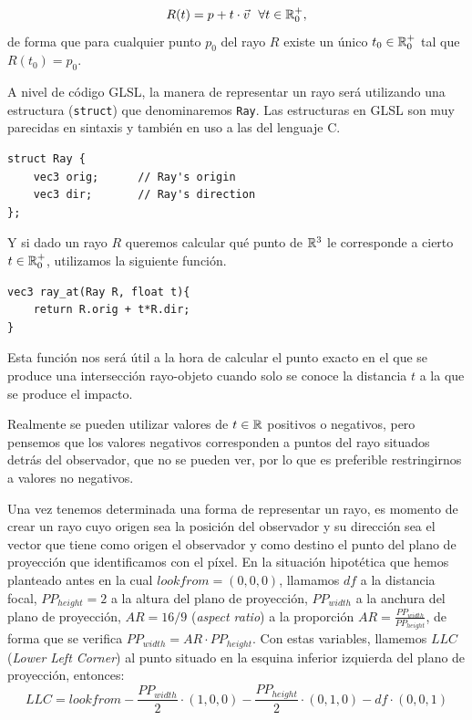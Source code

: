 $$
R(t) = p + t\cdot \vec v \ \ \forall t\in\mathbb{R}_0^+,
$$
de forma que para cualquier punto $p_0$ del rayo $R$ existe un único $t_0\in\mathbb{R}_0^+$ tal que $R(t_0) = p_0$.

A nivel de código GLSL, la manera de representar un rayo será utilizando una estructura (\verb|struct|) que denominaremos \verb|Ray|. Las estructuras en GLSL son muy parecidas en sintaxis y también en uso a las del lenguaje C. 

\begin{lstlisting}
struct Ray {
    vec3 orig;      // Ray's origin
    vec3 dir;       // Ray's direction
};
\end{lstlisting}

Y si dado un rayo $R$ queremos calcular qué punto de $\mathbb{R}^3$ le corresponde a cierto $t\in\mathbb{R}_0^+$, utilizamos la siguiente función.

\begin{lstlisting}
vec3 ray_at(Ray R, float t){
    return R.orig + t*R.dir;
}
\end{lstlisting}

Esta función nos será útil a la hora de calcular el punto exacto en el que se produce una intersección rayo-objeto cuando solo se conoce la distancia $t$ a la que se produce el impacto.

\begin{observacion}
    Realmente se pueden utilizar valores de $t\in\mathbb{R}$ positivos o negativos, pero pensemos que los valores negativos corresponden a puntos del rayo situados detrás del observador, que no se pueden ver, por lo que es preferible restringirnos a valores no negativos.
\end{observacion}

Una vez tenemos determinada una forma de representar un rayo, es momento de crear un rayo cuyo origen sea la posición del observador y su dirección sea el vector que tiene como origen el observador y como destino el punto del plano de proyección que identificamos con el píxel. En la situación hipotética que hemos planteado antes en la cual $lookfrom=(0,0,0)$, llamamos $df$ a la distancia focal, $PP_{height}=2$ a la altura del plano de proyección, $PP_{width}$ a la anchura del plano de proyección, $AR = 16/9$ (\textit{aspect ratio}) a la proporción $AR = \frac{PP_{width}}{PP_{height}}$, de forma que se verifica $PP_{width}=AR\cdot PP_{height}$. Con estas variables, llamemos $LLC$ (\textit{Lower Left Corner}) al punto situado en la esquina inferior izquierda del plano de proyección, entonces:
\begin{equation}
    \label{eq:LLC-inicial}
    LLC = lookfrom - \frac{PP_{width}}{2}\cdot(1,0,0) - \frac{PP_{height}}{2}\cdot(0,1,0) - df \cdot (0,0,1)
\end{equation}

